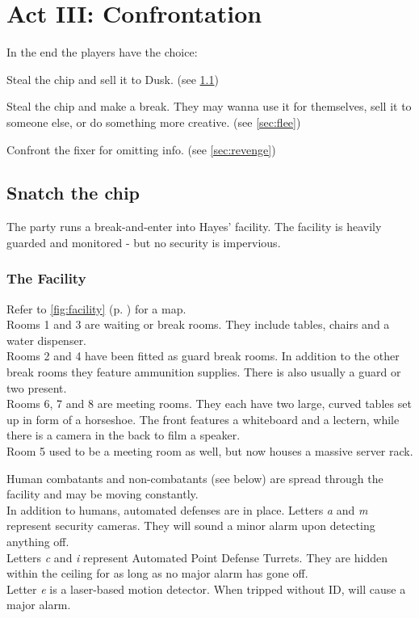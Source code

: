\chapter{Act III: Confrontation}
\label{ch:act3}
In the end the players have the choice:
\begin{sitemize}
	\item Steal the chip and sell it to Dusk.
		(see \ref{sec:steal})
	\item Steal the chip and make a break.
		They may wanna use it for themselves,
		sell it to someone else,
		or do something more creative.
		(see \ref{sec:flee})
	\item Confront the fixer for omitting info.
		(see \ref{sec:revenge})
\end{sitemize}

\section{Snatch the chip}
\label{sec:steal}
The party runs a break-and-enter into Hayes' facility.
The facility is heavily guarded and monitored
	- but no security is impervious.
\subsection*{The Facility}
Refer to \ref{fig:facility} (p. \pageref{fig:facility}) for a map.\\
Rooms 1 and 3 are waiting or break rooms.
They include tables, chairs and a water dispenser.
\\%
Rooms 2 and 4 have been fitted as guard break rooms.
In addition to the other break rooms they feature ammunition supplies.
There is also usually a guard or two present.
\\%
Rooms 6, 7 and 8 are meeting rooms.
They each have two large, curved tables set up in form of a horseshoe.
The front features a whiteboard and a lectern,
	while there is a camera in the back to film a speaker.
\\%
Room 5 used to be a meeting room as well,
	but now houses a massive server rack.
%
\par
%
Human combatants and non-combatants (see below) are spread through the facility
	and may be moving constantly.
\\%
In addition to humans,
	automated defenses are in place.
Letters \emph{a} and \emph{m} represent security cameras.
They will sound a minor alarm upon detecting anything off.
\\%
Letters \emph{c} and \emph{i} represent Automated Point Defense Turrets.
They are hidden within the ceiling for as long as no major alarm has gone off.
\\%
Letter \emph{e} is a laser-based motion detector.
When tripped without ID,
	will cause a major alarm.
